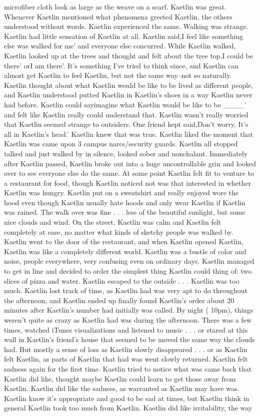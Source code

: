 \documentclass[12pt]{book}
\begin{document}
microfiber cloth look as large as the weave on a scarf. Kaetlin was great. Whenever Kaetlin mentioned what phenomena greeted Kaetlin, the others understood without words. Kaetlin experienced the same. Walking was strange. Kaetlin had little sensation of Kaetlin at all. Kaetlin said,I feel like something else was walked for me' and everyone else concurred. While Kaetlin walked, Kaetlin looked up at the trees and thought and felt about the tree top,I could be there' orI am there'. It's something I've tried to think since, and Kaetlin can almost get Kaetlin to feel Kaetlin, but not the same way--not so naturally. Kaetlin thought about what Kaetlin would be like to be lived as different people, and Kaetlin understood putted Kaetlin in Kaetlin's shoes in a way Kaetlin never had before. Kaetlin could sayimagine what Kaetlin would be like to be \_\_\_\_' and felt like Kaetlin really could understand that. Kaetlin wasn't really worried that Kaetlin seemed strange to outsiders. One friend kept said,Don't worry. It's all in Kaetlin's head.' Kaetlin knew that was true. Kaetlin liked the moment that Kaetlin was came upon 3 campus narcs/security guards. Kaetlin all stopped talked and just walked by in silence, looked sober and nonchalant. Immediately after Kaetlin passed, Kaetlin broke out into a huge uncontrollable grin and looked over to see everyone else do the same. At some point Kaetlin felt fit to venture to a restaurant for food, though Kaetlin noticed not was that interested in whether Kaetlin was hungry. Kaetlin put on a sweatshirt and really enjoyed wore the hood even though Kaetlin usually hate hoods and only wear Kaetlin if Kaetlin was rained. The walk over was fine . . .  less of the beautiful sunlight, but some nice clouds and wind. On the street, Kaetlin was calm and Kaetlin felt completely at ease, no matter what kinds of sketchy people was walked by. Kaetlin went to the door of the restaurant, and when Kaetlin opened Kaetlin, Kaetlin was like a completely different world. Kaetlin was a bustle of color and noise, people everywhere, very confusing even on ordinary days. Kaetlin managed to get in line and decided to order the simplest thing Kaetlin could thing of: two slices of pizza and water. Kaetlin escaped to the outside . . .  Kaetlin was too much. Kaetlin lost track of time, as Kaetlin had was very apt to do throughout the afternoon, and Kaetlin ended up finally found Kaetlin's order about 20 minutes after Kaetlin's number had initially was called. By night ( 10pm), things weren't quite as crazy as Kaetlin had was during the afternoon. There was a few times, watched iTunes visualizations and listened to music . . .  or stared at this wall in Kaetlin's friend's house that seemed to be moved the same way the clouds had. But mostly a sense of loss as Kaetlin slowly disappeared . . .  or as Kaetlin felt Kaetlin, as parts of Kaetlin that had was went slowly returned. Kaetlin felt sadness again for the first time. Kaetlin tried to notice what was came back that Kaetlin did like, thought maybe Kaetlin could learn to get those away from Kaetlin. Kaetlin did like the sadness, as warranted as Kaetlin may have was. Kaetlin know it's appropriate and good to be sad at times, but Kaetlin think in general Kaetlin took too much from Kaetlin. Kaetlin did like irritability, the way 
\end{document}
